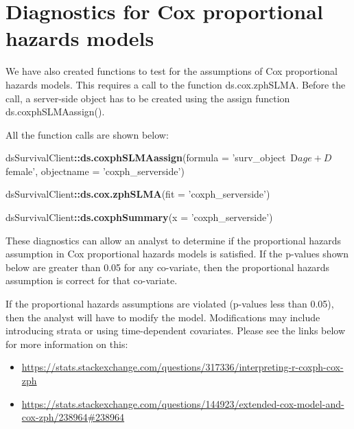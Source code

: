 \documentclass[
]{book}
\newenvironment{Shaded}{\begin{snugshade}}{\end{snugshade}}
\newcommand{\DataTypeTok}[1]{\textcolor[rgb]{0.13,0.29,0.53}{#1}}
\newcommand{\KeywordTok}[1]{\textcolor[rgb]{0.13,0.29,0.53}{\textbf{#1}}}
\newcommand{\NormalTok}[1]{#1}
\newcommand{\OperatorTok}[1]{\textcolor[rgb]{0.81,0.36,0.00}{\textbf{#1}}}
\newcommand{\StringTok}[1]{\textcolor[rgb]{0.31,0.60,0.02}{#1}}
\begin{document}
\hypertarget{diagnostics-for-cox-proportional-hazards-models}{%
\section{Diagnostics for Cox proportional hazards models}\label{diagnostics-for-cox-proportional-hazards-models}}

We have also created functions to test for the assumptions of
Cox proportional hazards models. This requires a call to the function ds.cox.zphSLMA. Before the call, a server-side object has to be created using the assign function ds.coxphSLMAassign().

All the function calls are shown below:

\begin{Shaded}
\begin{Highlighting}[]
\NormalTok{dsSurvivalClient}\OperatorTok{::}\KeywordTok{ds.coxphSLMAassign}\NormalTok{(}\DataTypeTok{formula =} \StringTok{'surv_object~D$age+D$female'}\NormalTok{,}
                            \DataTypeTok{objectname =} \StringTok{'coxph_serverside'}\NormalTok{)}
                
\NormalTok{dsSurvivalClient}\OperatorTok{::}\KeywordTok{ds.cox.zphSLMA}\NormalTok{(}\DataTypeTok{fit =} \StringTok{'coxph_serverside'}\NormalTok{)}

\NormalTok{dsSurvivalClient}\OperatorTok{::}\KeywordTok{ds.coxphSummary}\NormalTok{(}\DataTypeTok{x =} \StringTok{'coxph_serverside'}\NormalTok{)}
\end{Highlighting}
\end{Shaded}

These diagnostics can allow an analyst to determine if the proportional hazards assumption in Cox proportional hazards models is satisfied. If the p-values shown below are greater than 0.05 for any co-variate, then the proportional hazards assumption is correct for that co-variate.

If the proportional hazards assumptions are violated (p-values less than 0.05), then the analyst will have to modify the model. Modifications may include introducing strata or using time-dependent covariates. Please see the links below for more information on this:

\begin{itemize}
\item
  \url{https://stats.stackexchange.com/questions/317336/interpreting-r-coxph-cox-zph}
\item
  \url{https://stats.stackexchange.com/questions/144923/extended-cox-model-and-cox-zph/238964\#238964}
\end{itemize}
\end{document}
